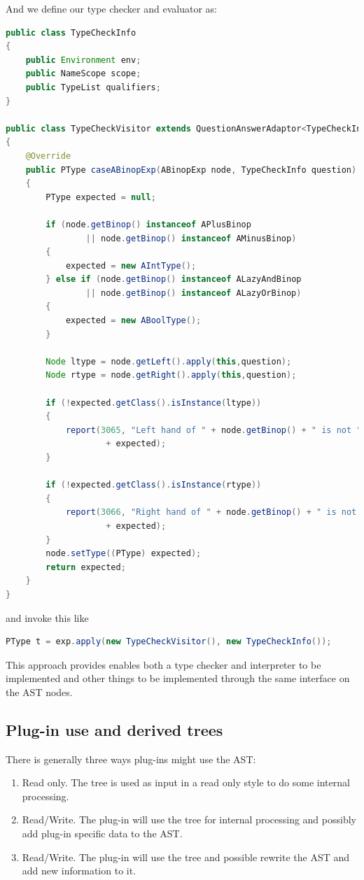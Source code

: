 \documentclass{overturerep}
\begin{document}
And we define our type checker and evaluator as:
\begin{lstlisting}[language=java]
public class TypeCheckInfo
{
	public Environment env;
	public NameScope scope;
	public TypeList qualifiers;
}

public class TypeCheckVisitor extends QuestionAnswerAdaptor<TypeCheckInfo, PType>
{
	@Override
	public PType caseABinopExp(ABinopExp node, TypeCheckInfo question)
	{
		PType expected = null;

		if (node.getBinop() instanceof APlusBinop
				|| node.getBinop() instanceof AMinusBinop)
		{
			expected = new AIntType();
		} else if (node.getBinop() instanceof ALazyAndBinop
				|| node.getBinop() instanceof ALazyOrBinop)
		{
			expected = new ABoolType();
		}

		Node ltype = node.getLeft().apply(this,question);
		Node rtype = node.getRight().apply(this,question);

		if (!expected.getClass().isInstance(ltype))
		{
			report(3065, "Left hand of " + node.getBinop() + " is not "
					+ expected);
		}

		if (!expected.getClass().isInstance(rtype))
		{
			report(3066, "Right hand of " + node.getBinop() + " is not "
					+ expected);
		}
		node.setType((PType) expected);
		return expected;
	}
}
\end{lstlisting}

and invoke this like

\begin{lstlisting}[language=java]
PType t = exp.apply(new TypeCheckVisitor(), new TypeCheckInfo());
\end{lstlisting}

This approach provides enables both a type checker and interpreter to be implemented and other things to be implemented through the same interface on the AST nodes.

\subsection{Plug-in use and derived trees}

There is generally three ways plug-ins might use the AST:
\begin{enumerate}
\item Read only. The tree is used as input in a read only style to do some internal processing.
\item Read/Write. The plug-in will use the tree for internal processing and possibly add plug-in specific data to the AST.
\item Read/Write. The plug-in will use the tree and possible rewrite the AST and add new information to it.
\end{enumerate}
\end{document}
